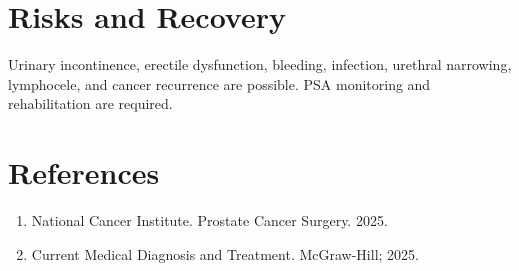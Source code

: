 \section*{Risks and Recovery}
Urinary incontinence, erectile dysfunction, bleeding, infection, urethral narrowing, lymphocele, and cancer recurrence are possible. PSA monitoring and rehabilitation are required.
\section*{References}
\begin{enumerate}\item National Cancer Institute. Prostate Cancer Surgery. 2025.\item Current Medical Diagnosis and Treatment. McGraw-Hill; 2025.\end{enumerate}
\clearpage
